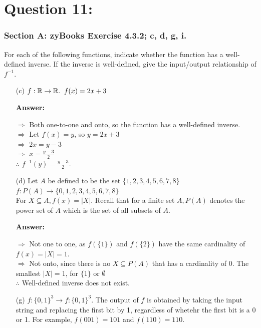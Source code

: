 \documentclass[14pt]{extreport}
\newcommand{\answer}[0]{\medskip \textbf{Answer:} \medskip}
\begin{document}
\section*{Question 11:}

\subsubsection*{Section A: zyBooks Exercise 4.3.2; c, d, g, i.}
    
For each of the following functions, indicate whether the function has a well-defined inverse. If the inverse is well-defined, give the input/output relationship of $f^{-1}$.
    
\begin{enumerate}
    \item[(c)] $f: \mathbb{R} \to \mathbb{R}. \hspace{2mm} f(x) = 2x+3$
    
        \answer

        $\Rightarrow$ Both one-to-one and onto, so the function has a well-defined inverse. \\
        $\Rightarrow$ Let $f(x)=y$, so $y=2x+3$\\
        $\Rightarrow$ $2x=y-3$\\
        $\Rightarrow$ $x=\frac{y-3}{2}$\\
        $\therefore$ $f^{-1}(y) = \frac{y-3}{2}$.
        \newline
    
    \item[(d)] Let $A$ be defined to be the set $\{1,2,3,4,5,6,7,8\}$ \\
    $f: P(A) \rightarrow \{0,1,2,3,4,5,6,7,8\}$ \\
    For $X \subseteq A, f(x) = |X|$. Recall that for a finite set $A, P(A)$ denotes the power set of $A$ which is the set of all subsets of $A$.
    
        \answer

        $\Rightarrow$ Not one to one, as $f(\{1\})$ and $f(\{2\})$ have the same cardinality of $f(x) = |X| = 1$. \\
        $\Rightarrow$ Not onto, since there is no $X \subseteq P(A)$ that has a cardinality of 0. The smallest $|X| =1$, for $\{1\}$ or $\emptyset$ \\
        $\therefore$ Well-defined inverse does not exist.
        \newline
        
    \item[(g)] $f:\{0,1\}^3 \rightarrow f:\{0,1\}^3$. The output of $f$ is obtained by taking the input string and replacing the first bit by 1, regardless of whetehr the first bit is a 0 or 1. For example, $f(001) = 101$ and $f(110) = 110.$
        

\end{enumerate}
\end{document}
